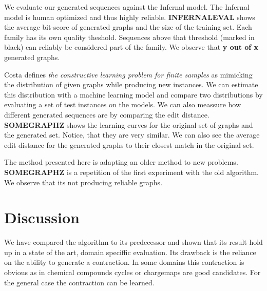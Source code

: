 \documentclass{article}
\begin{document}
We evaluate our generated sequences against the Infernal model.
The Infernal model is human optimized and thus highly reliable.
 \textbf{INFERNALEVAL} shows the average bit-score of generated graphs
and the size of the training set. Each family has its own quality theshold.
Sequences above that threshold (marked in black) can reliably be considered
part of the family. We observe that \textbf{y out of x} generated graphs.

Costa \cite{costa14} defines \emph{the constructive learning problem for 
finite samples} 
as mimicking the distribution of given graphs while producing new instances.
We can estimate this distribution with a machine learning
model and compare two distributions by evaluating a set of test instances
on the models. We can also meassure how different generated sequences
are by comparing the edit distance.
\textbf{SOMEGRAPHZ} shows the learning curves for the original set
of graphs and the generated set. Notice, that they are very similar.
We can also see the average edit distance for the generated graphs 
to their closest match in the original set.

The method presented here is adapting an older method to new problems.
\textbf{SOMEGRAPHZ} is a repetition of the first experiment with 
the old algorithm. We observe that its not producing reliable
graphs.

\section{Discussion} 
We have compared the algorithm to its predecessor and shown
that its result hold up in a state of the art, domain speciffic
evaluation. Its drawback is the reliance on the ability to 
generate a contraction. In some domains this contraction is 
obvious as in chemical compounds cycles or chargemaps are good candidates.
For the general case the contraction can be learned.


\end{document}
